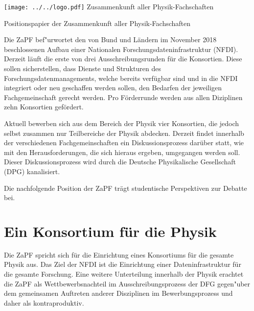 \documentclass[DIV=calc]{scrartcl}
\begin{document}
    \hspace{0.87\textwidth}
    \begin{minipage}{120pt}
        \vspace{-1.8cm}
      \texttt{[image: ../../logo.pdf]}
        \centering
        \small Zusammenkunft aller Physik-Fachschaften
    \end{minipage}
    \begin{center}
        \huge{Positionspapier der Zusammenkunft aller Physik-Fachschaften}\vspace{.25\baselineskip}\\
        \normalsize
    \end{center}
    \vspace{1cm}

Die ZaPF bef"urwortet den von Bund und Ländern im November 2018 beschlossenen Aufbau einer Nationalen Forschungsdateninfrastruktur (NFDI).
Derzeit läuft die erste von drei Ausschreibungsrunden für die Konsortien. 
Diese sollen sicherstellen, dass Dienste und Strukturen des Forschungsdatenmanagements, welche bereits  verfügbar sind und in die NFDI integriert oder neu geschaffen werden sollen, den Bedarfen der jeweiligen Fachgemeinschaft gerecht werden. 
Pro Förderrunde werden aus allen Diziplinen zehn Konsortien gefördert. 

Aktuell bewerben sich aus dem Bereich der Physik vier Konsortien, die jedoch selbst zusammen nur Teilbereiche der Physik abdecken. 
Derzeit findet innerhalb der verschiedenen Fachgemeinschaften ein Diskussionsprozess darüber statt, wie mit den Herausforderungen, die sich hieraus ergeben, umgegangen werden soll. 
Dieser Diskussionsprozess wird durch die Deutsche Physikalische Gesellschaft (DPG) kanalisiert.
    
Die nachfolgende Position der ZaPF trägt studentische Perspektiven zur Debatte bei.

\section{Ein Konsortium für die Physik}

Die ZaPF spricht sich für die Einrichtung eines Konsortiums für die gesamte Physik aus. 
Das Ziel der NFDI ist die Einrichtung einer Dateninfrastruktur für die gesamte Forschung. 
Eine weitere Unterteilung innerhalb der Physik erachtet die ZaPF als Wettbewerbsnachteil im Ausschreibungsprozess der DFG gegen"uber dem gemeinsamen Auftreten anderer Disziplinen im Bewerbungsprozess und daher als kontraproduktiv.
\end{document}
